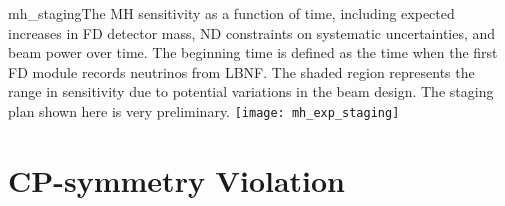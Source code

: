 \begin{cdrfigure}{mh_staging}{The MH sensitivity as a function of time, including expected increases in FD detector mass, ND constraints on systematic uncertainties, and beam power over time.  The beginning time is defined as the time when the first FD module records neutrinos from LBNF.  The shaded region represents the range in sensitivity due to potential variations in the beam design.  The staging plan shown here is very preliminary.}
 \texttt{[image: mh\_exp\_staging]}
\end{cdrfigure}


\section{CP-symmetry Violation}
\label{sec:physics-lbnosc-cpv}

